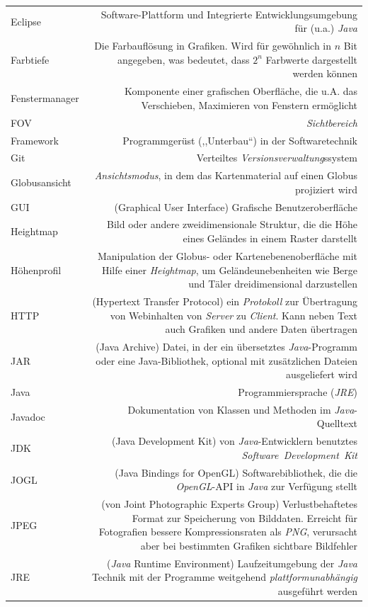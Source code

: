 \documentclass[10pt]{scrreprt}
\newcommand{\textref}[1]{\mbox{\raisebox{0.1ex}{\small$\rightarrow$ }\textit{#1}}}
\begin{document}
\begin{longtabu}{L{0.35} R{1.65}}
Eclipse & Software-Plattform und Integrierte Entwicklungsumgebung für (u.a.) \textref{Java}\\
Farbtiefe & Die Farbauflösung in Grafiken. Wird für gewöhnlich in $n$ Bit angegeben, was bedeutet, dass $2^n$ Farbwerte dargestellt werden können\\
Fenstermanager & Komponente einer grafischen Oberfläche, die u.A. das Verschieben, Maximieren von Fenstern ermöglicht\\
FOV & \textref{Sichtbereich}\\
Framework & Programmgerüst (,,Unterbau``) in der Softwaretechnik \\
Git & Verteiltes \textref{Versionsverwaltung}ssystem\\
Globusansicht & \textref{Ansichtsmodus}, in dem das Kartenmaterial auf einen Globus projiziert wird\\
GUI& (Graphical User Interface) Grafische Benutzeroberfläche\\
Heightmap & Bild oder andere zweidimensionale Struktur, die die Höhe eines Geländes in einem Raster darstellt\\
Höhenprofil & Manipulation der Globus- oder Kartenebenenoberfläche mit Hilfe einer \textref{Heightmap}, um Geländeunebenheiten wie Berge und Täler dreidimensional darzustellen\\
HTTP & (Hypertext Transfer Protocol) ein \textref{Protokoll} zur Übertragung von Webinhalten von \textref{Server} zu \textref{Client}. Kann neben Text auch Grafiken und andere Daten übertragen\\
JAR & (Java Archive) Datei, in der ein übersetztes \textref{Java}-Programm oder eine Java-Bibliothek, optional mit zusätzlichen Dateien ausgeliefert wird\\
Java & Programmiersprache (\textref{JRE})\\
Javadoc & Dokumentation von Klassen und Methoden im \textref{Java}-Quelltext\\
JDK & (Java Development Kit) von \textref{Java}-Entwicklern benutztes \textref{Software Development Kit}\\
JOGL & (Java Bindings for OpenGL) Softwarebibliothek, die die \textref{OpenGL}-API in \textref{Java} zur Verfügung stellt\\
JPEG & (von Joint Photographic Experts Group) Verlustbehaftetes Format zur Speicherung von Bilddaten. Erreicht für Fotografien bessere Kompressionsraten als \textref{PNG}, verursacht aber bei bestimmten Grafiken sichtbare Bildfehler\\
JRE & (\textref{Java} Runtime Environment) Laufzeitumgebung der \textref{Java} Technik mit der Programme weitgehend \textref{plattformunabhängig} ausgeführt werden\\

\end{longtabu}
\end{document}
